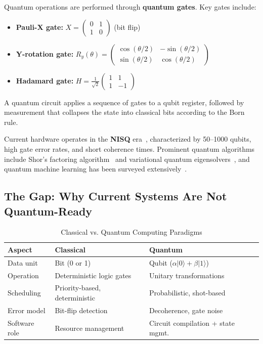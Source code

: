 ﻿\documentclass[12pt,a4paper]{article}
\begin{document}
Quantum operations are performed through \textbf{quantum gates}. Key gates include:
\begin{itemize}
    \item \textbf{Pauli-X gate:} $X = \begin{pmatrix} 0 & 1 \\ 1 & 0 \end{pmatrix}$ (bit flip)
    \item \textbf{Y-rotation gate:} $R_y(\theta) = \begin{pmatrix} \cos(\theta/2) & -\sin(\theta/2) \\ \sin(\theta/2) & \cos(\theta/2) \end{pmatrix}$
    \item \textbf{Hadamard gate:} $H = \frac{1}{\sqrt{2}}\begin{pmatrix} 1 & 1 \\ 1 & -1 \end{pmatrix}$
\end{itemize}

A quantum circuit applies a sequence of gates to a qubit register, followed by measurement that collapses the state into classical bits according to the Born rule.

Current hardware operates in the \textbf{NISQ} era~\cite{preskill2018}, characterized by 50--1000 qubits, high gate error rates, and short coherence times. Prominent quantum algorithms include Shor's factoring algorithm~\cite{shor1994} and variational quantum eigensolvers~\cite{kandala2017}, and quantum machine learning has been surveyed extensively~\cite{biamonte2017,cerezo2021}.

\subsection{The Gap: Why Current Systems Are Not Quantum-Ready}

\begin{table}[H]
\centering
\caption{Classical vs. Quantum Computing Paradigms}
\label{tab:comparison}
\small
\begin{tabular}{@{}lll@{}}
\toprule
\textbf{Aspect} & \textbf{Classical} & \textbf{Quantum} \\
\midrule
Data unit & Bit (0 or 1) & Qubit ($\alpha|0\rangle + \beta|1\rangle$) \\
Operation & Deterministic logic gates & Unitary transformations \\
Scheduling & Priority-based, deterministic & Probabilistic, shot-based \\
Error model & Bit-flip detection & Decoherence, gate noise \\
Software role & Resource management & Circuit compilation + state mgmt. \\
\bottomrule
\end{tabular}
\end{table}
\end{document}
